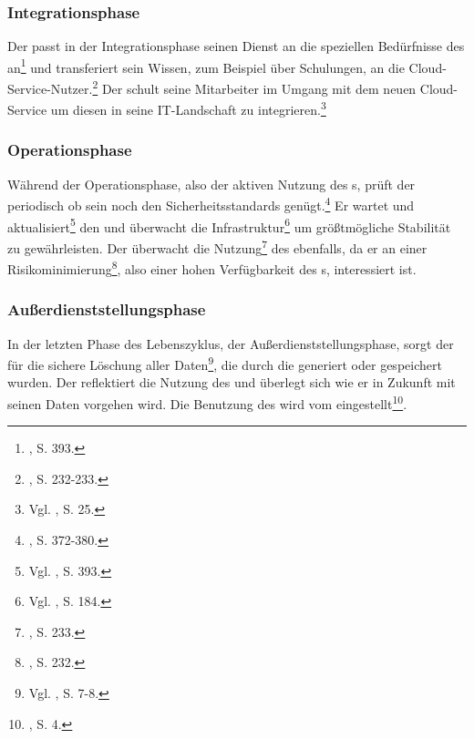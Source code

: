 \subsubsection{Integrationsphase}
Der \CSP passt in der Integrationsphase seinen Dienst an die speziellen Bedürfnisse des \CSUs an\footnote{\cite{Esteves.2007}, S. 393.}\saveFN{\Esteves} und transferiert sein Wissen, zum Beispiel über Schulungen\useFN{\Esteves}, an die Cloud-Service-Nutzer.\footnote{\cite{Cullen.2005}, S. 232-233.}
Der \CSU schult seine Mitarbeiter im Umgang mit dem neuen Cloud-Service\useFN{\Esteves} um diesen in seine IT-Landschaft zu integrieren.\footnote{Vgl. \cite{Lindner.2011}, S. 25.}

\subsubsection{Operationsphase}
Während der Operationsphase, also der aktiven Nutzung des \Cs s, prüft der \CSP periodisch ob sein \CS noch den Sicherheitsstandards genügt.\footnote{\cite{Ahmad.2011}, S. 372-380.} Er wartet und aktualisiert\footnote{Vgl. \cite{Esteves.2007}, S. 393.} den \CS und überwacht die Infrastruktur\footnote{Vgl. \cite{Taylor.2007}, S. 184.} um größtmögliche Stabilität zu gewährleisten.
Der \CSU überwacht die Nutzung\footnote{\cite{Cullen.2005}, S. 233.}\saveFN{\Cullen} des \CS ebenfalls, da er an einer Risikominimierung\footnote{\cite{Cullen.2005}, S. 232.}, also einer hohen Verfügbarkeit des \Cs s, interessiert ist.

\subsubsection{Außerdienststellungsphase}
In der letzten Phase des Lebenszyklus, der Außerdienststellungsphase, sorgt der \CSP für die sichere Löschung aller Daten\footnote{Vgl. \cite{Badger.2011}, S. 7-8.}, die durch die \CSU generiert oder gespeichert wurden.
Der \CSU reflektiert die Nutzung des \CSs und überlegt sich wie er in Zukunft mit seinen Daten vorgehen wird.\useFN{\Cullen} Die Benutzung des \CSs wird vom \CSU eingestellt\footnote{\cite{Praeg.2006}, S. 4.}.
